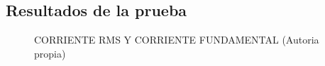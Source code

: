     \subsection{Resultados de la prueba}
    \begin{figure}[H]
      \hfill
      \hfill
      \hfill
      \caption{CORRIENTE RMS Y CORRIENTE FUNDAMENTAL (Autoria propia)}
      \end{figure}

